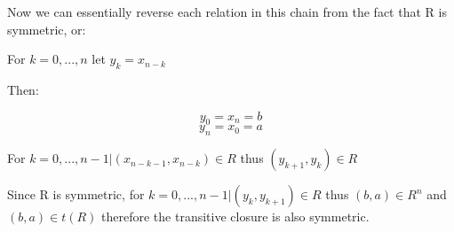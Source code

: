 \documentclass[paper=a4, fontsize=11pt]{scrartcl} %
\numberwithin{equation}{section} %
\numberwithin{figure}{section} %
\numberwithin{table}{section} %
\begin{document}
Now we can essentially reverse each relation in this chain from the fact that R is symmetric, or:

For $k = 0,...,n$ let $y_k = x_{n-k}$

Then:

$$y_0 = x_n = b$$
$$y_n = x_0 = a$$

For $k = 0,...,n -1\vert (x_{n-k-1}, x_{n-k}) \in R$ thus $(y_{k+1}, y_k) \in R$

Since R is symmetric, for $k = 0,...,n-1 \vert (y_k, y_{k+1}) \in R$ thus $(b,a) \in R^n$ and $(b,a) \in t(R)$ therefore the transitive closure is also symmetric.


\end{document}
